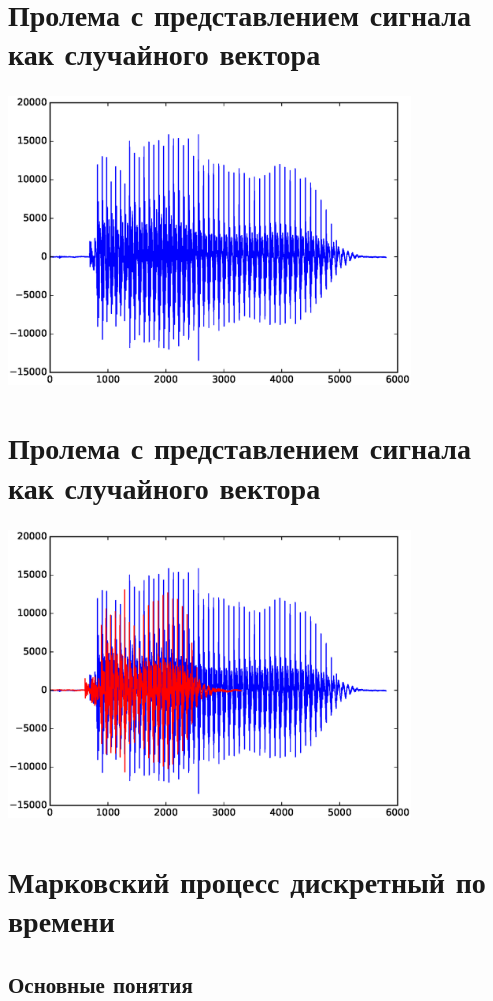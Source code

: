 \documentclass{beamer}
\begin{document}
\section{Пролема с представлением сигнала как случайного вектора}
\begin{frame}
  \frametitle{\insertsection}
  \includegraphics[width=0.8\textwidth]{a_long.eps}
\end{frame}

\section{Пролема с представлением сигнала как случайного вектора}
\begin{frame}
  \frametitle{\insertsection}
  \includegraphics[width=0.8\textwidth]{a_long_short.eps}
\end{frame}

\section{Марковский процесс дискретный по времени}
\subsection{Основные понятия}
\end{document}
